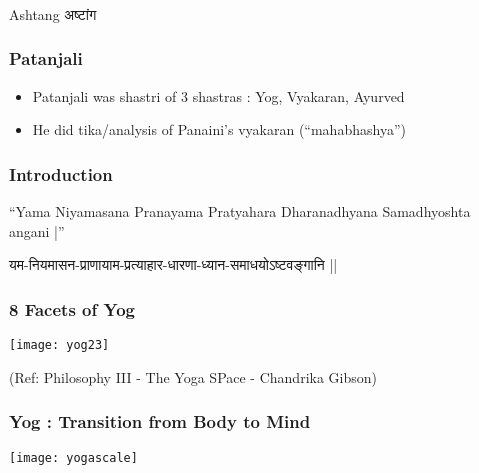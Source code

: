 \begin{frame}[fragile]\frametitle{}
\begin{center}
{\Large Ashtang अष्टांग }
\end{center}
\end{frame}

\begin{frame}[fragile]\frametitle{Patanjali}


	\begin{itemize}
	\item Patanjali was shastri of 3 shastras : Yog, Vyakaran, Ayurved
	\item He did tika/analysis of Panaini's vyakaran (``mahabhashya'')
	\end{itemize}


\end{frame}



\begin{frame}[fragile]\frametitle{Introduction}
``Yama Niyamasana Pranayama Pratyahara Dharanadhyana Samadhyoshta angani |''

यम-नियमासन-प्राणायाम-प्रत्याहार-धारणा-ध्यान-समाधयोऽष्टवङ्गानि ||

\end{frame}


\begin{frame}[fragile]\frametitle{8 Facets of Yog}

\begin{center}
\texttt{[image: yog23]}

\tiny{(Ref: Philosophy III - The Yoga SPace - Chandrika Gibson)}
\end{center}

\end{frame}

\begin{frame}[fragile]\frametitle{Yog : Transition from Body to Mind}

\begin{center}
\texttt{[image: yogascale]}

\end{center}

\end{frame}